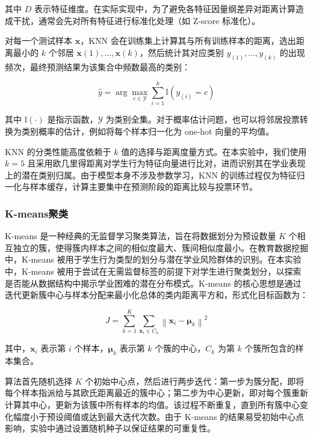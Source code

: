 \documentclass[a4paper, utf8]{ctexart}
\begin{document}
	其中 $D$ 表示特征维度。在实际实现中，为了避免各特征因量纲差异对距离计算造成干扰，通常会先对所有特征进行标准化处理（如 Z-score 标准化）。
	
	对每一个测试样本 $\mathbf{x}$，KNN 会在训练集上计算其与所有训练样本的距离，选出距离最小的 $k$ 个邻居 ${\mathbf{x}{(1)}, \dots, \mathbf{x}{(k)}}$，然后统计其对应类别 ${y_{(1)}, \dots, y_{(k)}}$ 的出现频次，最终预测结果为该集合中频数最高的类别：
	
	\vspace{-.5em}
	\begin{equation}
		\hat{y}=\arg\max_{c\in\mathcal{Y}}\sum^k_{i=1}\mathbb{I}(y_{(i)}=c)
	\end{equation}
	
	其中 $\mathbb{I}(\cdot)$ 是指示函数，$\mathcal{Y}$ 为类别全集。对于概率估计问题，也可以将邻居投票转换为类别概率的估计，例如将每个样本归一化为 one-hot 向量的平均值。
	
	KNN 的分类性能高度依赖于 $k$ 值的选择与距离度量方式。在本实验中，我们使用 $k=5$ 且采用欧几里得距离对学生行为特征向量进行比对，进而识别其在学业表现上的潜在类别归属。由于模型本身不涉及参数学习，KNN 的训练过程仅为特征归一化与样本缓存，计算主要集中在预测阶段的距离比较与投票环节。
	
	\subsubsection{K-means聚类}
	
	K-means 是一种经典的无监督学习聚类算法，旨在将数据划分为预设数量 $K$ 个相互独立的簇，使得簇内样本之间的相似度最大、簇间相似度最小。在教育数据挖掘中，K-means 被用于学生行为类型的划分与潜在学业风险群体的识别\cite{ref17,ref18}。在本实验中，K-means 被用于尝试在无需监督标签的前提下对学生进行聚类划分，以探索是否能从数据结构中揭示学业困难的潜在分布模式。K-means 的核心思想是通过迭代更新簇中心与样本分配来最小化总体的类内距离平方和，形式化目标函数为：
	
	\vspace{-.5em}
	\begin{equation}
		J=\sum^{K}_{k=1}\sum_{\mathbf{x}_i\in C_k}\left\| \mathbf{x}_i - \mathbf{\mu}_k \right\|^2
	\end{equation}
	
	其中，$\mathbf{x}_i$ 表示第 $i$ 个样本，$\mathbf{\mu}_k$ 表示第 $k$ 个簇的中心，$C_k$ 为第 $k$ 个簇所包含的样本集合。
	
	算法首先随机选择 $K$ 个初始中心点，然后进行两步迭代：第一步为簇分配，即将每个样本指派给与其欧氏距离最近的簇中心；第二步为中心更新，即对每个簇重新计算其中心，更新为该簇中所有样本的均值。该过程不断重复，直到所有簇中心变化幅度小于预设阈值或达到最大迭代次数。由于 K-means 的结果易受初始中心点影响，实验中通过设置随机种子以保证结果的可重复性。
	
\end{document}
